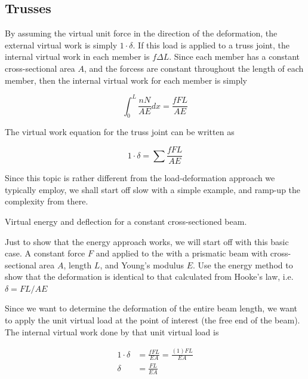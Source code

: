 \documentclass[
10pt,
a4paper,
openany,
svgnames,
]{kaobook} %
\begin{document}
\subsection{Trusses}

By assuming the virtual unit force in the direction of the deformation, the external virtual work is simply $1 \cdot \delta$. If this load is applied to a truss joint, the internal virtual work in each member is $f \Delta L$. Since each member has a constant cross-sectional area $A$, and the forcess are constant throughout the length of each member, then the internal virtual work for each member is simply

\begin{equation*}
  \int_0^L \frac{nN}{AE} dx = \frac{fFL}{AE}
\end{equation*}

The virtual work equation for the truss joint can be written as

\begin{equation}
  1 \cdot \delta = \sum \frac{fFL}{AE}
\end{equation}

Since this topic is rather different from the load-deformation approach we typically employ, we shall start off slow with a simple example, and ramp-up the complexity from there.

\begin{example} Virtual energy and deflection for a constant cross-sectioned beam.

  Just to show that the energy approach works, we will start off with this basic case. A constant force $F$ and applied to the with a prismatic beam with cross-sectional area $A$, length $L$, and Young's modulus $E$. Use the energy method to show that the deformation is identical to that calculated from Hooke's law, i.e. $\delta = FL/AE$

  \centering
\end{example}
\begin{solution}
  Since we want to determine the deformation of the entire beam length, we want to apply the unit virtual load at the point of interest (the free end of the beam). The internal virtual work done by that unit virtual load is

  \begin{align*}
    1 \cdot \delta &= \frac{fFL}{EA} = \frac{(1)FL}{EA} \\
    \delta &= \frac{FL}{EA} 
  \end{align*}
\end{solution}
\end{document}
